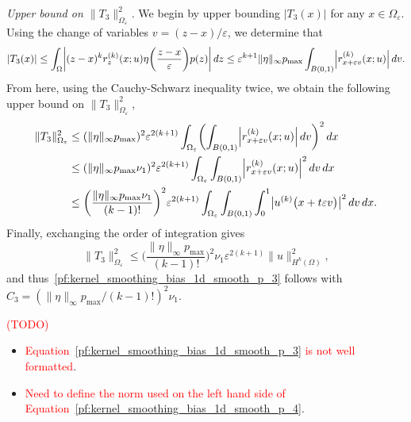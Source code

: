 \documentclass{article}
\newcommand{\1}{\mathbf{1}}
\theoremstyle{definition}
\theoremstyle{remark}
\begin{document}
\textit{Upper bound on $\|T_3\|_{\Omega_{\varepsilon}}^2$.}
We begin by upper bounding $|T_3(x)|$ for any $x \in \Omega_{\varepsilon}$. Using the change of variables $v = (z - x)/\varepsilon$, we determine that
\begin{equation*}
|T_3(x)| \leq \int_{\Omega} \biggl| (z - x)^{k} r_z^{(k)}(x;u) \eta\biggl(\frac{z - x}{\varepsilon}\biggr)  p(z) \biggr|\,dz  \leq \varepsilon^{k + 1} \|\eta\|_{\infty} p_{\max} \int_{B(0,1)} \Bigl|r_{x + \varepsilon v}^{(k)}(x;u)\Bigr| \,dv.
\end{equation*}
From here, using the Cauchy-Schwarz inequality twice, we obtain the following upper bound on $\|T_3\|_{\Omega_{\varepsilon}}^2$,
\begin{align*}
\|T_3\|_{\Omega_{\varepsilon}}^2 & \leq (\|\eta\|_{\infty} p_{\max})^2 \varepsilon^{2(k + 1)} \int_{\Omega_{\varepsilon}}\biggl(\int_{B(0,1)} \Bigl|r_{x + \varepsilon v}^{(k)}(x;u)\Bigr| \,dv\biggr)^2 \,dx \\
& \leq (\|\eta\|_{\infty} p_{\max} \nu_1)^2 \varepsilon^{2(k + 1)} \int_{\Omega_{\varepsilon}} \int_{B(0,1)}\Bigl|r_{x + \varepsilon v}^{(k)}(x;u)\Bigr|^2 \,dv \,dx \\
& \leq \biggl(\frac{\|\eta\|_{\infty} p_{\max} \nu_1}{(k - 1)!}\biggr)^2 \varepsilon^{2(k + 1)} \int_{\Omega_{\varepsilon}} \int_{B(0,1)} \int_{0}^{1} \bigl|u^{(k)}\bigl(x + t\varepsilon v\bigr)\bigr|^2 \,dv \,dx.
\end{align*}
Finally, exchanging the order of integration gives
\begin{equation*}
\|T_3\|_{\Omega_{\varepsilon}}^2 \leq \biggl(\frac{\|\eta\|_{\infty} p_{\max}}{(k - 1)!}\biggr)^2 \nu_1 \varepsilon^{2(k + 1)} \|u\|_{H^k(\Omega)}^2,
\end{equation*}
and thus~\eqref{pf:kernel_smoothing_bias_1d_smooth_p_3} follows with $C_3 = (\|\eta\|_{\infty} p_{\max}/(k - 1)!)^2 \nu_1$. 

\textcolor{red}{(TODO)}
\begin{itemize}
	\item \textcolor{red}{Equation~\eqref{pf:kernel_smoothing_bias_1d_smooth_p_3} is not well formatted}.
	\item \textcolor{red}{Need to define the norm used on the left hand side of  Equation~\eqref{pf:kernel_smoothing_bias_1d_smooth_p_4}}.
\end{itemize}
\end{document}
